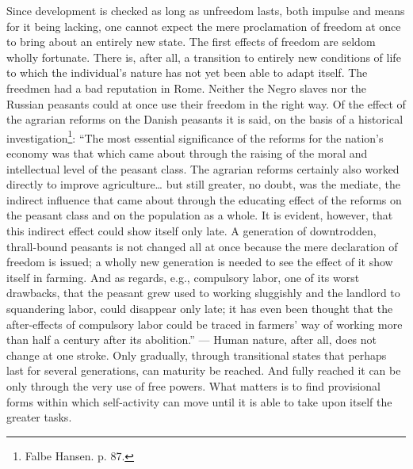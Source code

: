 \documentclass[12pt,a4paper,openany]{book}
\newcommand{\opage}[1]{\marginnote{\footnotesize\textit{[#1]}}}
\begin{document}
Since development is checked as long as unfreedom lasts, both impulse and means for it being lacking, one cannot expect
the mere proclamation of freedom at once to bring about an entirely new state. The first effects of freedom are seldom
wholly fortunate. There is, after all, a transition to entirely new conditions of life to which the individual's nature
has not yet been able to adapt itself. The freedmen had a bad reputation in Rome. Neither the Negro slaves nor the
Russian peasants could at once use their freedom in the right way. Of the effect of the agrarian reforms on the Danish
peasants it is said, on the basis of a historical investigation\footnote[1]{Falbe Hansen. p. 87.}: ``The most essential
significance of the reforms for the nation's economy was that which came about through the raising of the moral and
intellectual level of the peasant class. The agrarian reforms certainly also worked directly to improve agriculture\dots{}
but still greater, no doubt, was the mediate, the indirect influence that came about through the educating effect of the
reforms on the peasant class and on the population as a whole. It is evident, however, that this indirect effect could
\opage{352}show itself only late. A generation of downtrodden, thrall-bound peasants is not changed all at once because
the mere declaration of freedom is issued; a wholly new generation is needed to see the effect of it show itself in
farming. And as regards, e.g., compulsory labor, one of its worst drawbacks, that the peasant grew used to working
sluggishly and the landlord to squandering labor, could disappear only late; it has even been thought that the
after-effects of compulsory labor could be traced in farmers' way of working more than half a century after its
abolition.'' --- Human nature, after all, does not change at one stroke. Only gradually, through transitional states that
perhaps last for several generations, can maturity be reached. And fully reached it can be only through the very use of
free powers. What matters is to find provisional forms within which self-activity can move until it is able to take
upon itself the greater tasks.
\end{document}
